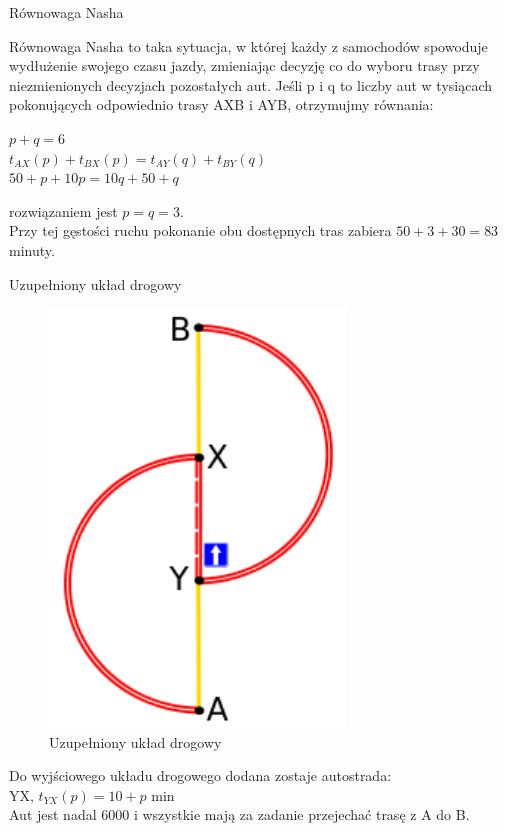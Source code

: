 \documentclass{beamer}
\begin{document}
\begin{frame}{Równowaga Nasha\cite{braess}} 

Równowaga Nasha to taka sytuacja, w której każdy z samochodów spowoduje wydłużenie swojego czasu jazdy, zmieniając decyzję co do wyboru trasy przy niezmienionych decyzjach pozostałych aut.
\newline\newline
Jeśli p i q to liczby aut w tysiącach pokonujących odpowiednio trasy AXB i AYB, otrzymujmy równania:

\begin{center}
$p+q = 6 $\\
$t_{AX}(p)+t_{BX}(p) = t_{AY}(q) + t_{BY}(q)$\\
$50+p+10p = 10q+50+q$
\end{center}
rozwiązaniem jest $p=q=3$.\\
Przy tej gęstości ruchu pokonanie obu dostępnych tras zabiera $50+3+30=83$ minuty.
\end{frame}

\begin{frame}{Uzupełniony układ drogowy \cite{braess}} 

\centering
\begin{minipage}{.48\textwidth}
\begin{figure}[h!]
\includegraphics[width=0.7\textwidth]{img/braess2}
\caption{Uzupełniony układ drogowy}
\end{figure}
\end{minipage}\hfill
\begin{minipage}{.48\textwidth}
Do wyjściowego układu drogowego dodana zostaje autostrada:\\

YX, $t_{YX}(p) =  10 + p$ min\\

Aut jest nadal 6000 i wszystkie mają za zadanie przejechać trasę z A do B.

\end{minipage}\hfill
\end{frame}
\end{document}
